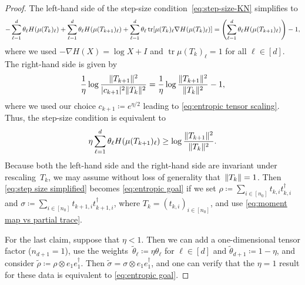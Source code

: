 \documentclass[11pt,letterpaper]{article}
\numberwithin{equation}{section}
\newcommand{\ot}{\otimes}
\DeclareMathOperator{\tr}{tr}
\DeclarePairedDelimiter\abs{\lvert}{\rvert}
\DeclarePairedDelimiter\norm{\lVert}{\rVert}
\begin{document}
\begin{proof}
The left-hand side of the step-size condition~\eqref{eq:step-size-KN} simplifies to
\begin{align*}
    -\sum_{\ell=1}^d \theta_\ell H(\mu(T_k)_\ell) + \sum_{\ell=1}^d \theta_\ell H(\mu(T_{k+1})_\ell) + \sum_{\ell=1}^d \theta_\ell \tr\mleft[ \mu(T_k)_\ell \nabla H(\mu(T_k)_\ell) \mright]
= \left( \sum_{\ell=1}^d \theta_\ell H(\mu(T_{k+1})_\ell) \right) - 1,
\end{align*}
where we used $-\nabla H(X) = \log X + I$ and $\tr \mu(T_k)_\ell = 1$ for all $\ell\in[d]$.
The right-hand side is given by
\begin{align*}
\frac1\eta \log\frac{\norm{T_{k+1}}^2}{\abs{c_{k+1}}^2\norm{T_k}^2}
= \frac1\eta \log\frac{\norm{T_{k+1}}^2}{\norm{T_k}^2} - 1,
\end{align*}
where we used our choice $c_{k+1} \coloneqq e^{\eta/2}$ leading to \cref{eq:entropic tensor scaling}.
Thus, the step-size condition is equivalent to
\begin{align}\label{eq:step size simplified}
    \eta \sum_{\ell=1}^d \theta_\ell H(\mu(T_{k+1})_\ell) \geq \log \frac{\norm{T_{k+1}}^2}{\norm{T_k}^2}.
\end{align}
Because both the left-hand side and the right-hand side are invariant under rescaling~$T_k$, we may assume without loss of generality that~$\norm{T_k} = 1$.
Then \cref{eq:step size simplified} becomes \cref{eq:entropic goal} if we set $\rho \coloneqq \sum_{i\in [n_0]}t_{k,i}t_{k,i}^\dagger$ and $\sigma \coloneqq \sum_{i\in [n_0]}t_{k+1,i}t_{k+1,i}^\dagger$, where $T_k = (t_{k,i})_{i\in[n_0]}$, and use \cref{eq:moment map vs partial trace}.

For the last claim, suppose that $\eta<1$.
Then we can add a one-dimensional tensor factor ($n_{d+1}=1$), use the weights~$\tilde\theta_\ell \coloneqq \eta\theta_\ell$ for $\ell\in[d]$ and $\tilde\theta_{d+1} \coloneqq 1-\eta$, and consider $\tilde\rho \coloneqq \rho \ot e_1 e_1^\dagger$.
Then $\tilde\sigma = \sigma \ot e_1 e_1^\dagger$, and one can verify that the $\eta=1$ result for these data is equivalent to \cref{eq:entropic goal}.
\end{proof}
\end{document}
